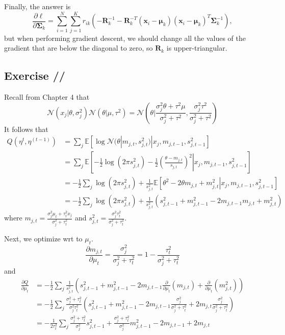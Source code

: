 \documentclass[a4paper,11pt]{article}
\newcounter{exercise}
\newcounter{subexercise}
\newcommand*{\exercise}[1][]{\subsection*{Exercise \ifx/#1/\stepcounter{exercise}\arabic{exercise}\else#1\fi}\setcounter{subexercise}{0}}
\begin{document}
Finally, the answer is
\[
    \frac{\partial\ell}{\partial\boldsymbol\Sigma_k} =
    \sum\limits_{i=1}^{N}\sum\limits_{j=1}^K r_{ik} \left(
        -\mathbf R^{-1}_k
        - \mathbf R ^{-T}_k(\mathbf{x}_i-\boldsymbol{\mu}_k)
        (\mathbf{x}_i-\boldsymbol{\mu}_k)^T\boldsymbol{\Sigma}^{-1}_k
    \right),
\]
but when performing gradient descent, we should change all the values of the
gradient that are below the diagonal to zero,
so $\mathbf{R}_k$ is upper-triangular.

\setcounter{exercise}{12}
\exercise

Recall from Chapter 4 that
\begin{equation}
    \mathcal{N}(x_j|\theta, \sigma_j^2)\mathcal{N}(\theta|\mu, \tau^2)
    = \mathcal{N}\left(
        \theta|
        \frac{\sigma_j^2\theta + \tau^2\mu}{\sigma_j^2+\tau^2}, 
        \frac{\sigma_j^2\tau^2}{\sigma_j^2+\tau^2}
    \right)
\end{equation}
It follows that
\begin{align*}
    Q(\eta^t, \eta^{(t-1)})
    &= \sum\limits_j \mathbb{E}\left[
        \log\mathcal{N}(\theta|m_{j,t}, s_{j,t}^2) |
        x_j, m_{j,t-1}, s_{j,t-1}^2
    \right] \\
    &= \sum\limits_j \mathbb{E}\left[\left.
         -\frac12\log(2\pi s_{j,t}^2) -\frac12\left(
             \frac{\theta - m_{j,t}}{s_{j,t}}
        \right)^2 \right|
        x_j, m_{j,t-1}, s_{j,t-1}^2
    \right] \\
    &= -\frac12\sum\limits_j 
         \log(2\pi s_{j,t}^2) +
         \frac1{s_{j,t}^2}\mathbb{E}\left[\left.
             \theta^2 - 2\theta m_{j,t} + m_{j,t}^2
        \right|
        x_j, m_{j,t-1}, s_{j,t-1}^2
    \right] \\
    &= -\frac12\sum\limits_j 
    \log(2\pi s_{j,t}^2) +
    \frac1{s_{j,t}^2}\left(
        s_{j,t-1}^2 + m_{j,t-1}^2 - 2m_{j,t-1} m_{j,t} + m_{j,t}^2
    \right)
\end{align*}
where $m_{j,t} = \frac{\sigma_j^2\mu_t + \tau_t^2x_j}{\sigma_j^2+\tau_t^2}$
and $s_{j,t}^2 = \frac{\sigma_j^2\tau_t^2}{\sigma_j^2+\tau_t^2}$.

Next, we optimize wrt to $\mu_t$.
\[
    \frac{\partial m_{j,t}}{\partial\mu_t} = \frac{\sigma^2_j}{\sigma^2_j + \tau^2_t}
    = 1 - \frac{\tau_t^2}{\sigma^2_j + \tau^2_t}
\]
and
\begin{align*}
    \frac{\partial Q}{\partial \mu_t} &= -\frac12\sum\limits_j 
    \frac1{s_{j,t}^2}\left(
        s_{j,t-1}^2
        + m_{j,t-1}^2
        - 2m_{j,t-1}\frac{\partial}{\partial \mu_t} \left(m_{j,t}\right)
        +  \frac{\partial}{\partial \mu_t} \left(m_{j,t}^2\right)
    \right) \\
    &= -\frac12\sum\limits_j 
    \frac{\sigma_j^2+\tau_t^2}{\sigma_j^2\tau_t^2}\left(
        s_{j,t-1}^2
        + m_{j,t-1}^2
        - 2m_{j,t-1} \frac{\sigma^2_j}{\sigma^2_j + \tau^2_t}
        + 2m_{j,t} \frac{\sigma^2_j}{\sigma^2_j + \tau^2_t}
    \right) \\
    &= -\frac1{2\tau_t^2}\sum\limits_j 
    \frac{\sigma_j^2+\tau_t^2}{\sigma_j^2} s_{j,t-1}^2
    + \frac{\sigma_j^2+\tau_t^2}{\sigma_j^2} m_{j,t-1}^2
    - 2m_{j,t-1}
    + 2m_{j,t}
\end{align*}
\end{document}
